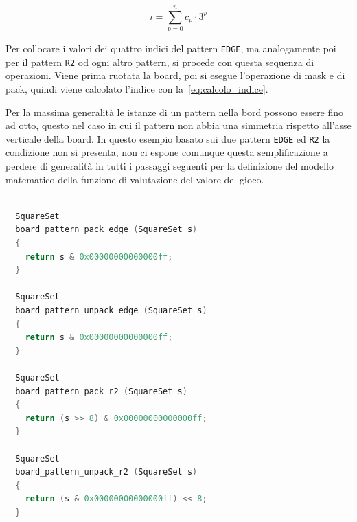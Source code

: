 \begin{equation}
  i = \sum_{p=0}^{n} c_p \cdot 3^p
  \label{eq:calcolo_indice}
\end{equation}

Per collocare i valori dei quattro indici del pattern \texttt{EDGE}, ma analogamente poi per il pattern \texttt{R2} od ogni altro pattern, si procede con questa sequenza
di operazioni. Viene prima ruotata la board, poi si esegue l'operazione di mask e di pack, quindi viene calcolato l'indice con la~\ref{eq:calcolo_indice}.

Per la massima generalità le istanze di un pattern nella bord possono essere fino ad otto, questo nel caso in cui il pattern non abbia una simmetria rispetto all'asse verticale
della board. In questo esempio basato sui due pattern \texttt{EDGE} ed \texttt{R2} la condizione non si presenta, non ci espone comunque questa semplificazione a perdere di generalità
in tutti i passaggi seguenti per la definizione del modello matematico della funzione di valutazione del valore del gioco.

\begin{lstlisting}[language=C]

  SquareSet
  board_pattern_pack_edge (SquareSet s)
  {
    return s & 0x00000000000000ff;
  }

  SquareSet
  board_pattern_unpack_edge (SquareSet s)
  {
    return s & 0x00000000000000ff;
  }

  SquareSet
  board_pattern_pack_r2 (SquareSet s)
  {
    return (s >> 8) & 0x00000000000000ff;
  }

  SquareSet
  board_pattern_unpack_r2 (SquareSet s)
  {
    return (s & 0x00000000000000ff) << 8;
  }

\end{lstlisting}


